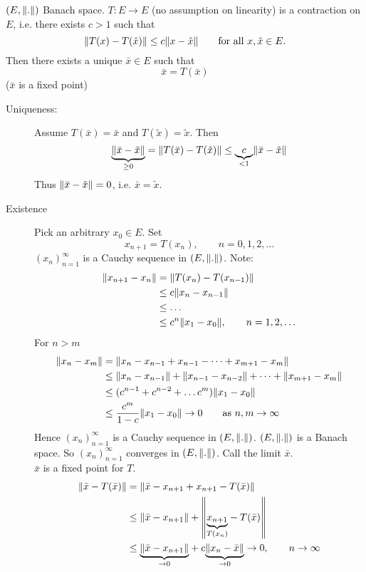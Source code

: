 \begin{theorem}
	$(E, \norm{.})$ Banach space. $T: E \to E$ (no assumption on linearity) is a contraction on $E$, i.e. there exists $c>1$ such that
	\[
		\norm{T(x)-T(\tilde x)} \leq c \norm{x- \tilde x} \qquad \text{for all }x,\tilde x \in E.
	\]
	Then there exists a unique $ \bar{x} \in E$ such that 
	\[
		\bar{x} = T( \bar{ x})
	\]
	($\bar{x}$ is a fixed point)
\end{theorem}
\begin{beweis}
	\begin{description}
		\item[Uniqueness:]Assume $T( \bar{x}) = \bar{x}$ and $T ( \tilde x) = \tilde x$. Then
		\[
			\underset{\geq 0}{\underbrace{\norm{ \bar{ x} - \tilde x }}} = \norm{T( \bar{x})- T( \tilde x)} \leq \underset{< 1}{\underbrace{c}} \norm{ \bar{x}- \tilde x}
		\] 
		Thus $\norm{\bar{x}- \tilde x} = 0$, i.e. $\bar{x} = \tilde x$.
		\item[Existence] Pick an arbitrary $x_0 \in E$. Set
		\[
			x_{n+1} = T(x_{n}), \qquad n=0,1,2,\dots
		\]
		$(x_n)_{n=1}^{\infty}$ is a Cauchy sequence in $(E,\norm{.})$.
		Note:
		\begin{align*}
			\norm{x_{n+1}-x_n}  &= \norm{T(x_n)-T(x_{n-1})} \\
			&\leq  c \norm{x_n - x_{n-1}} \\
			&\leq \dots \\
			&\leq  c^n \norm{x_1-x_0}, \qquad n=1,2,\dots 
		\end{align*}
		For $n>m$
		\begin{align*}
			\norm{x_n-x_m} &= \norm{x_n - x_{n-1}+ x_{n-1}- \dots + x_{m+1}- x_m} \\
			&\leq \norm{x_n - x_{n-1}} + \norm{x_{n-1} - x_{n-2}} + \dots + \norm{x_{m+1}- x_m} \\
			&\leq (c^{n-1}+ c^{n-2} + \dots c^m) \norm{x_1-x_0} \\
			&\leq \frac{c^m}{1-c} \norm{x_1 - x_0} \to 0 \qquad \text{as }n,m \to \infty
		\end{align*}
		Hence $(x_n)_{n=1}^{\infty}$ is a Cauchy sequence in $(E,\norm{.})$. $(E, \norm{.})$ is a Banach space. So $(x_n)_{n=1}^{\infty}$ converges in $(E,\norm{.})$. Call the limit $\bar{x}$. \\
		$\bar{x}$ is a fixed point for $T$. 
		\begin{align*}
			\norm{\bar{ x}- T(\bar{x})} & = \norm{\bar{x}-x_{n+1}+ x_{n+1} - T(\bar{x})} \\
			&\leq \norm{\bar{x}-x_{n+1}} + \norm{\underset{T(x_n)}{\underbrace{x_{n+1}}} - T(\bar{x})} \\
			&\leq \underset{\to 0}{\underbrace{\norm{\bar{x}- x_{n+1}}}} + c \underset{\to 0}{\underbrace{\norm{x_n - \bar{x}}}} \to 0, \qquad n \to \infty
		\end{align*}
	\end{description}
\end{beweis}
